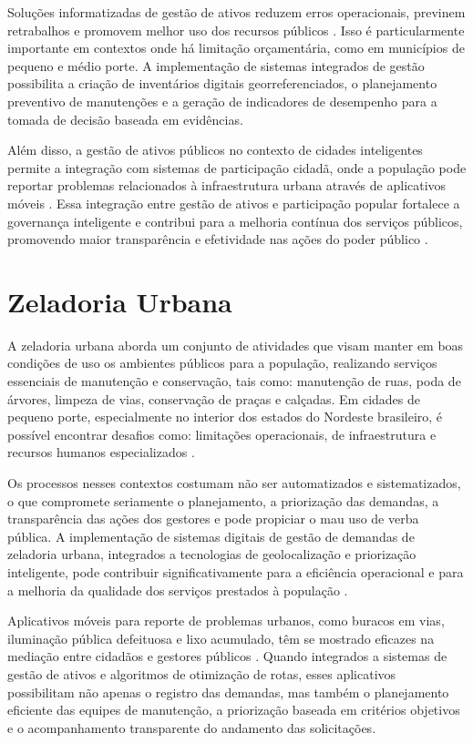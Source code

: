 Soluções informatizadas de gestão de ativos reduzem erros operacionais, previnem 
retrabalhos e promovem melhor uso dos recursos públicos \cite{STORCK2017}. Isso é 
particularmente importante em contextos onde há limitação orçamentária, como em municípios 
de pequeno e médio porte. A implementação de sistemas integrados de gestão possibilita a 
criação de inventários digitais georreferenciados, o planejamento preventivo de manutenções 
e a geração de indicadores de desempenho para a tomada de decisão baseada em evidências.

Além disso, a gestão de ativos públicos no contexto de cidades inteligentes permite a 
integração com sistemas de participação cidadã, onde a população pode reportar problemas 
relacionados à infraestrutura urbana através de aplicativos móveis \cite{SANTOS2019}. Essa 
integração entre gestão de ativos e participação popular fortalece a governança inteligente e 
contribui para a melhoria contínua dos serviços públicos, promovendo maior transparência e 
efetividade nas ações do poder público \cite{OLIVEIRA2020}.

\section{Zeladoria Urbana}

A zeladoria urbana aborda um conjunto de atividades que visam manter em boas condições 
de uso os ambientes públicos para a população, realizando serviços essenciais de manutenção e 
conservação, tais como: manutenção de ruas, poda de árvores, limpeza de vias, conservação de 
praças e calçadas. Em cidades de pequeno porte, especialmente no interior dos estados do 
Nordeste brasileiro, é possível encontrar desafios como: limitações operacionais, de 
infraestrutura e recursos humanos especializados \cite{SANTOS2019}. 

Os processos nesses contextos costumam não ser automatizados e sistematizados, o que 
compromete seriamente o planejamento, a priorização das demandas, a transparência das ações 
dos gestores e pode propiciar o mau uso de verba pública. A implementação de sistemas digitais 
de gestão de demandas de zeladoria urbana, integrados a tecnologias de geolocalização e 
priorização inteligente, pode contribuir significativamente para a eficiência operacional e para 
a melhoria da qualidade dos serviços prestados à população \cite{OLIVEIRA2020}.

Aplicativos móveis para reporte de problemas urbanos, como buracos em vias, iluminação 
pública defeituosa e lixo acumulado, têm se mostrado eficazes na mediação entre cidadãos e 
gestores públicos \cite{SANTOS2019}. Quando integrados a sistemas de gestão de ativos e 
algoritmos de otimização de rotas, esses aplicativos possibilitam não apenas o registro das 
demandas, mas também o planejamento eficiente das equipes de manutenção, a priorização 
baseada em critérios objetivos e o acompanhamento transparente do andamento das solicitações.


